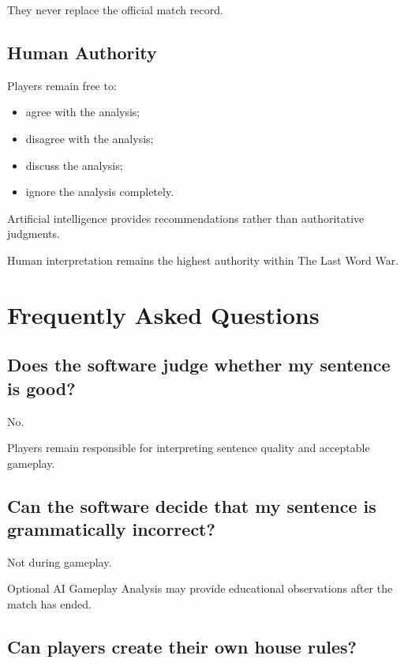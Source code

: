 \documentclass[11pt,a4paper]{article}
\begin{document}
They never replace the official match record.

\subsection{Human Authority}

Players remain free to:

\begin{itemize}
    \item agree with the analysis;
    \item disagree with the analysis;
    \item discuss the analysis;
    \item ignore the analysis completely.
\end{itemize}

Artificial intelligence provides recommendations rather than authoritative judgments.

Human interpretation remains the highest authority within The Last Word War\texttrademark.

\section{Frequently Asked Questions}

\subsection*{Does the software judge whether my sentence is good?}

No.

Players remain responsible for interpreting sentence quality and acceptable gameplay.

\subsection*{Can the software decide that my sentence is grammatically incorrect?}

Not during gameplay.

Optional AI Gameplay Analysis may provide educational observations after the match has ended.

\subsection*{Can players create their own house rules?}
\end{document}
